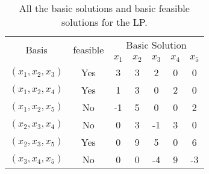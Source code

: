 \documentclass[12pt]{article}
\begin{document}
\begin{enumerate}
\begin{enumerate}
                        \begin{table}[H]
                              \centering
                              \begin{tabular}{|c|c|c|c|c|c|c|}
                                    \hline
                                    \multirow{2}{*}{Basis} & \multirow{2}{*}{feasible} & \multicolumn{5}{|c|}{Basic Solution}                                 \\
                                    \cline{3-7}            &                           & $x_1$                                & $x_2$ & $x_3$ & $x_4$ & $x_5$ \\
                                    \hline
                                    $(x_1,x_2,x_3)$        & Yes                       & 3                                    & 3     & 2     & 0     & 0     \\
                                    $(x_1,x_2,x_4)$        & Yes                       & 1                                    & 3     & 0     & 2     & 0     \\
                                    $(x_1,x_2,x_5)$        & No                        & -1                                   & 5     & 0     & 0     & 2     \\
                                    $(x_2,x_3,x_4)$        & No                        & 0                                    & 3     & -1    & 3     & 0     \\
                                    $(x_2,x_3,x_5)$        & Yes                       & 0                                    & 9     & 5     & 0     & 6     \\
                                    $(x_3,x_4,x_5)$        & No                        & 0                                    & 0     & -4    & 9     & -3    \\
                                    \hline
                              \end{tabular}
                              \caption{All the basic solutions and basic feasible solutions for the LP.}
                              \label{tab:1}
                        \end{table}


\end{enumerate}
\end{enumerate}
\end{document}
